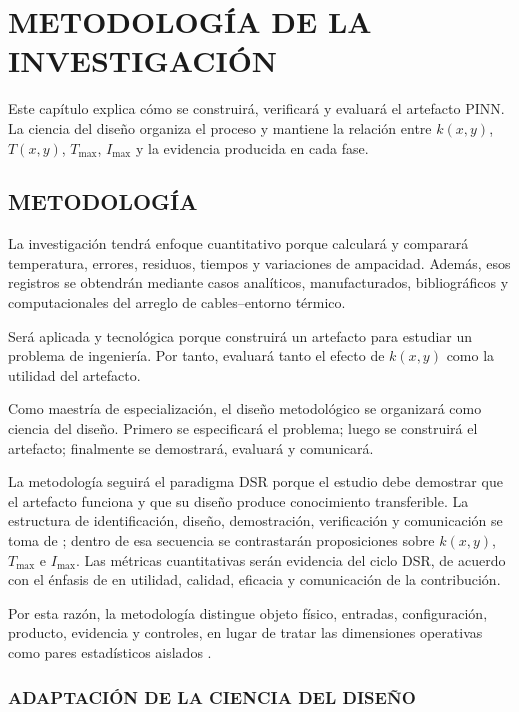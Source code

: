 \documentclass[11pt,a4paper,oneside]{report}
\newcommand{\Tmax}{T_{\max}}
\newcommand{\Imax}{I_{\max}}
\newcommand{\kx}{k(x,y)}
\begin{document}
\chapter{METODOLOGÍA DE LA INVESTIGACIÓN}
\label{ch:metodologia}
\thispagestyle{empty}

Este capítulo explica cómo se construirá, verificará y evaluará el artefacto PINN. La ciencia del diseño organiza el proceso y mantiene la relación entre $\kx$, $T(x,y)$, $\Tmax$, $\Imax$ y la evidencia producida en cada fase.

\section{METODOLOGÍA}
\label{sec:metodologia}

La investigación tendrá enfoque cuantitativo porque calculará y comparará temperatura, errores, residuos, tiempos y variaciones de ampacidad. Además, esos registros se obtendrán mediante casos analíticos, manufacturados, bibliográficos y computacionales del arreglo de cables--entorno térmico.

Será aplicada y tecnológica porque construirá un artefacto para estudiar un problema de ingeniería. Por tanto, evaluará tanto el efecto de $\kx$ como la utilidad del artefacto.

Como maestría de especialización, el diseño metodológico se organizará como ciencia del diseño. Primero se especificará el problema; luego se construirá el artefacto; finalmente se demostrará, evaluará y comunicará.

La metodología seguirá el paradigma DSR porque el estudio debe demostrar que el artefacto funciona y que su diseño produce conocimiento transferible. La estructura de identificación, diseño, demostración, verificación y comunicación se toma de \textcite[55--56]{peffers2007}; dentro de esa secuencia se contrastarán proposiciones sobre $\kx$, $\Tmax$ e $\Imax$. Las métricas cuantitativas serán evidencia del ciclo DSR, de acuerdo con el énfasis de \textcite[349--351]{gregor2013} en utilidad, calidad, eficacia y comunicación de la contribución. 

Por esta razón, la metodología distingue objeto físico, entradas, configuración, producto, evidencia y controles, en lugar de tratar las dimensiones operativas como pares estadísticos aislados \parencites[55--56]{peffers2007}[342--344]{gregor2013}.

\subsection{ADAPTACIÓN DE LA CIENCIA DEL DISEÑO}
\end{document}
